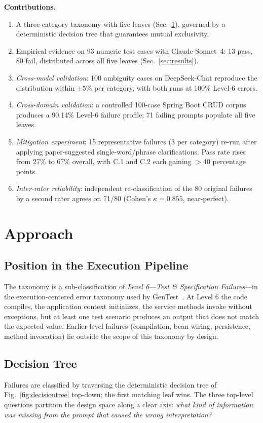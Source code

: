 \documentclass[conference]{IEEEtran}
\begin{document}
\textbf{Contributions.}
\begin{enumerate}\itemsep0pt
  \item A three-category taxonomy with five leaves (Sec.~\ref{sec:approach}), governed by a deterministic decision tree that guarantees mutual exclusivity.
  \item Empirical evidence on 93 numeric test cases with Claude Sonnet~4: 13 pass, 80 fail, distributed across all five leaves (Sec.~\ref{sec:results}).
  \item \emph{Cross-model validation}: 100 ambiguity cases on DeepSeek-Chat reproduce the distribution within $\pm 5\%$ per category, with both runs at 100\% Level-6 errors.
  \item \emph{Cross-domain validation}: a controlled 100-case Spring Boot CRUD corpus produces a 90.14\% Level-6 failure profile; 71 failing prompts populate all five leaves.
  \item \emph{Mitigation experiment}: 15 representative failures (3 per category) re-run after applying paper-suggested single-word/phrase clarifications. Pass rate rises from 27\% to 67\% overall, with C.1 and C.2 each gaining $>$40 percentage points.
  \item \emph{Inter-rater reliability}: independent re-classification of the 80 original failures by a second rater agrees on 71/80 (Cohen's $\kappa{=}0.855$, near-perfect).
\end{enumerate}

\section{Approach}\label{sec:approach}

\subsection{Position in the Execution Pipeline}
The taxonomy is a sub-classification of \emph{Level 6}—\emph{Test \& Specification Failures}—in the execution-centered error taxonomy used by GenTest~\cite{anonymizedphd}. At Level 6 the code compiles, the application context initializes, the service methods invoke without exceptions, but at least one test scenario produces an output that does not match the expected value. Earlier-level failures (compilation, bean wiring, persistence, method invocation) lie outside the scope of this taxonomy by design.

\subsection{Decision Tree}\label{sec:decisiontree}
Failures are classified by traversing the deterministic decision tree of Fig.~\ref{fig:decisiontree} top-down; the first matching leaf wins. The three top-level questions partition the design space along a clear axis: \emph{what kind of information was missing from the prompt that caused the wrong interpretation?}
\end{document}
